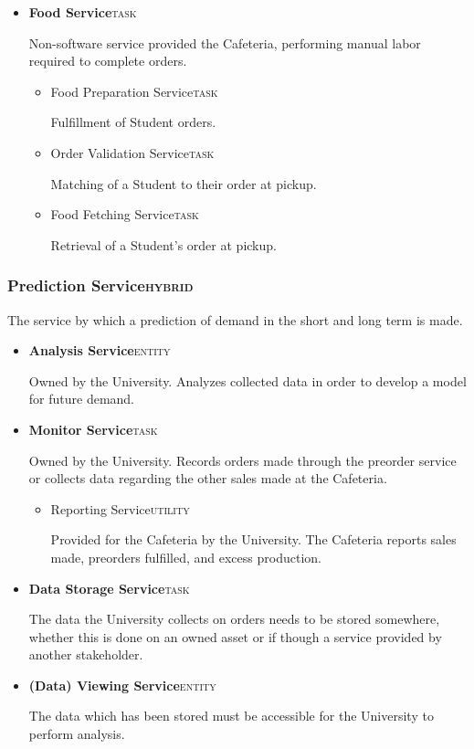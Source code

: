 \documentclass[11pt]{article}
\begin{document}
\begin{itemize}
\item \textbf{Food Service}\hfill{}\textsc{task}
\label{sec:orgd369ff5}

Non-software service provided the Cafeteria, performing manual
labor required to complete orders.

\begin{itemize}
\item Food Preparation Service\hfill{}\textsc{task}
\label{sec:org7af2d3d}

Fulfillment of Student orders.

\item Order Validation Service\hfill{}\textsc{task}
\label{sec:org4b53c32}

Matching of a Student to their order at pickup.

\item Food Fetching Service\hfill{}\textsc{task}
\label{sec:org063b798}

Retrieval of a Student's order at pickup.
\end{itemize}
\end{itemize}

\subsubsection*{Prediction Service\hfill{}\textsc{hybrid}}
\label{sec:orga4697d2}
The service by which a prediction of demand in the short and long
term is made.
\begin{itemize}
\item \textbf{Analysis Service}\hfill{}\textsc{entity}
\label{sec:orgff30248}

Owned by the University. Analyzes collected data in order to
develop a model for future demand.

\item \textbf{Monitor Service}\hfill{}\textsc{task}
\label{sec:org85a7e37}

Owned by the University. Records orders made through the preorder
service or collects data regarding the other sales made at the
Cafeteria.

\begin{itemize}
\item Reporting Service\hfill{}\textsc{utility}
\label{sec:orgc0bff6c}

Provided for the Cafeteria by the University. The Cafeteria
reports sales made, preorders fulfilled, and excess production.
\end{itemize}

\item \textbf{Data Storage Service}\hfill{}\textsc{task}
\label{sec:org33337d2}

The data the University collects on orders needs to be stored
somewhere, whether this is done on an owned asset or if though a
service provided by another stakeholder.

\item \textbf{(Data) Viewing Service}\hfill{}\textsc{entity}
\label{sec:org0eadd7a}

The data which has been stored must be accessible for the
University to perform analysis.
\end{itemize}
\end{document}
